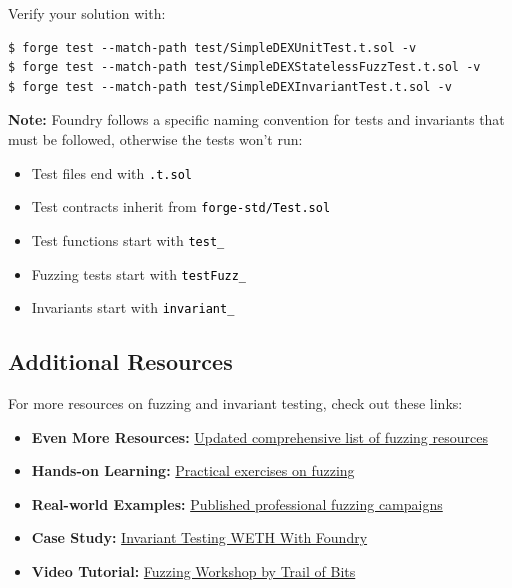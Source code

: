 \documentclass[12pt]{article}
\newcommand{\codegrey}[1]{%
  \texttt{\colorbox{black!4}{\textcolor{black}{#1}}}%
}
\begin{document}
\medskip
\noindent
Verify your solution with:

\noindent \begin{minipage}{\textwidth}
    \begin{verbatim}
$ forge test --match-path test/SimpleDEXUnitTest.t.sol -v
$ forge test --match-path test/SimpleDEXStatelessFuzzTest.t.sol -v
$ forge test --match-path test/SimpleDEXInvariantTest.t.sol -v
\end{verbatim}
\end{minipage}

\noindent
\textbf{Note:} Foundry follows a specific naming convention for tests and invariants that must be followed, otherwise the tests won't run:

\begin{itemize}
    \item Test files end with \codegrey{.t.sol}
    \item Test contracts inherit from \codegrey{forge-std/Test.sol}
    \item Test functions start with \codegrey{test\_}
    \item Fuzzing tests start with \codegrey{testFuzz\_}
    \item Invariants start with \codegrey{invariant\_}
\end{itemize}

\subsection*{Additional Resources}
\medskip
\noindent
For more resources on fuzzing and invariant testing, check out these links:
\begin{itemize}
    \item \textbf{Even More Resources:} \href{https://github.com/perimetersec/evm-fuzzing-resources?tab=readme-ov-file#evm-fuzzing-resources}{Updated comprehensive list of fuzzing resources}
    \item \textbf{Hands-on Learning:} \href{https://github.com/crytic/building-secure-contracts/tree/master/program-analysis/echidna/exercises}{Practical exercises on fuzzing}
    \item \textbf{Real-world Examples:} \href{https://github.com/perimetersec/public-fuzzing-campaigns-list}{Published professional fuzzing campaigns}
    \item \textbf{Case Study:} \href{https://mirror.xyz/horsefacts.eth/Jex2YVaO65dda6zEyfM_-DXlXhOWCAoSpOx5PLocYgw}{Invariant Testing WETH With Foundry}
    \item \textbf{Video Tutorial:} \href{https://www.youtube.com/playlist?list=PLciHOL_J7Iwqdja9UH4ZzE8dP1IxtsBXI}{Fuzzing Workshop by Trail of Bits}
\end{itemize}
\end{document}
